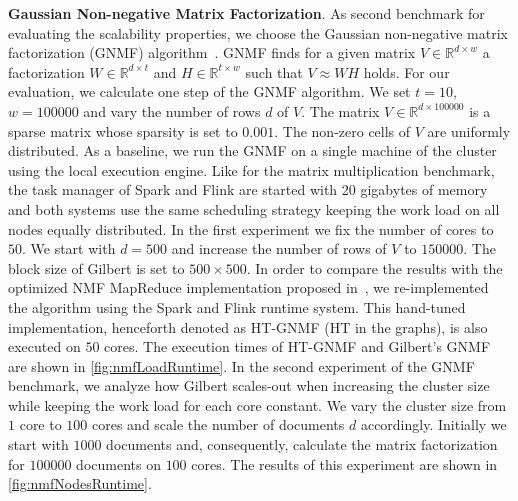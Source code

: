 \textbf{Gaussian Non-negative Matrix Factorization}. As second benchmark for evaluating the scalability properties, we choose the Gaussian non-negative matrix factorization (GNMF) algorithm~\cite{seung:anips2001a}.
GNMF finds for a given matrix $V \in \mathbb{R}^{d\times w}$ a factorization $W \in \mathbb{R}^{d\times t}$ and $H \in \mathbb{R}^{t\times w}$ such that $V\approx W H$ holds.
For our evaluation, we calculate one step of the GNMF algorithm.
We set $t=10$, $w=100000$ and vary the number of rows $d$ of $V$.
The matrix $V\in\mathbb{R}^{d\times 100000}$ is a sparse matrix whose sparsity is set to $0.001$.
The non-zero cells of $V$ are uniformly distributed.
As a baseline, we run the GNMF on a single machine of the cluster using the local execution engine.
Like for the matrix multiplication benchmark, the task manager of Spark and Flink are started with 20 gigabytes of memory and both systems use the same scheduling strategy keeping the work load on all nodes equally distributed.
In the first experiment we fix the number of cores to $50$.
We start with $d=500$ and increase the number of rows of $V$ to $150000$.
The block size of Gilbert is set to $500 \times 500$.
In order to compare the results with the optimized NMF MapReduce implementation proposed in~\cite{liu:2010a}, we re-implemented the algorithm using the Spark and Flink runtime system.
This hand-tuned implementation, henceforth denoted as HT-GNMF (HT in the graphs), is also executed on $50$ cores.
The execution times of HT-GNMF and Gilbert's GNMF are shown in \cref{fig:nmfLoadRuntime}.
In the second experiment of the GNMF benchmark, we analyze how Gilbert scales-out when increasing the cluster size while keeping the work load for each core constant.
We vary the cluster size from $1$ core to $100$ cores and scale the number of documents $d$ accordingly.
Initially we start with $1000$ documents and, consequently, calculate the matrix factorization for $100000$ documents on $100$ cores.
The results of this experiment are shown in \cref{fig:nmfNodesRuntime}.


